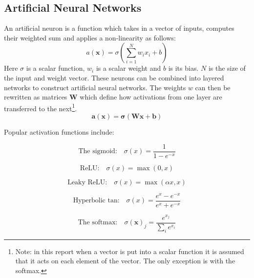     \subsection{Artificial Neural Networks} \label{sec:anns}
      An artificial neuron is a function which takes in a vector of inputs, computes their
      weighted sum and applies a non-linearity as follows:
      \begin{equation}
        a(\mathbf{x}) = \sigma \left ( \sum_{i=1}^N w_ix_i + b \right )
      \end{equation}
      Here $\sigma$ is a scalar function, $w_i$ is a scalar weight and $b$ is its bias. $N$ is the size of the input and weight vector.
      These neurons can be combined into layered networks to construct artificial neural networks.
      The weights $w$ can then be rewritten as matrices $\mathbf{W}$ which define how
      activations from one layer are transferred to the next\footnote{Note: in this report when a vector
      is put into a scalar function it is assumed that it acts on each element of
      the vector. The only exception is with the softmax.}.
      \begin{equation}
        \mathbf{a}(\mathbf{x}) = \mathbf{\sigma} \left ( \mathbf{W}\mathbf{x} + \mathbf{b} \right ) \label{eq:softmax}
      \end{equation}

      Popular activation functions include:
      \begin{multicols}{2}


        \begin{equation}
          \text{The sigmoid:}\quad
          \sigma (x) = \frac{1}{1-e^{-x}} \label{eq:sigmoid}
        \end{equation}


        \begin{equation}
          \text{ReLU:}\quad
          \sigma(x) = \max(0,x)
        \end{equation}

        \begin{equation}
          \text{Leaky ReLU:}\quad
          \sigma(x) = \max(\alpha x,x)
        \end{equation}


        \begin{equation}
          \text{Hyperbolic tan:}\quad
          \sigma(x)=\frac{e^x - e^{-x}}{e^x + e^{-x}}
        \end{equation}


        \begin{equation}
          \text{The softmax:}\quad
          \sigma(\mathbf{x})_j = \frac{e^{x_j}}{\sum_i e^{x_i}}
        \end{equation}


      \end{multicols}

